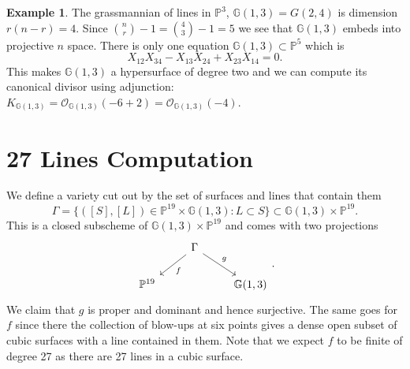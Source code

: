 \documentclass[12pt]{article}
\numberwithin{equation}{section}
\theoremstyle{definition}
\newtheorem{example}[theorem]{Example}
\theoremstyle{remark}
\newcommand{\Ocal}{\mathcal{O}}
\newcommand{\PP}{\mathbb{P}}
\newcommand{\GG}{\mathbb{G}}
\begin{document}
\begin{example}
	The grassmannian of lines in $\PP^3$, $\GG(1,3) = G(2,4)$ is dimension $r(n-r)=4$. 
	Since ${n \choose r } -1 = {4 \choose 3} -1 =5$ we see that $\GG(1,3)$ embeds into projective $n$ space. 
	There is only one equation $\GG(1,3)\subset \PP^5$ which is 
	$$ X_{12}X_{34}-X_{13}X_{24}+X_{23}X_{14}=0.$$
	This makes $\GG(1,3)$ a hypersurface of degree two and we can compute its canonical divisor using adjunction: $ K_{\GG(1,3)} = \Ocal_{\GG(1,3)}(-6+2) = \Ocal_{\GG(1,3)}(-4).$
\end{example}

\section{27 Lines Computation}

We define a variety cut out by the set of surfaces and lines that contain them
$$ \Gamma = \lbrace ([S],[L]) \in \PP^{19}\times \GG(1,3) \colon L \subset S \rbrace \subset \GG(1,3) \times \PP^{19}.$$
This is a closed subscheme of $\GG(1,3)\times \PP^{19}$ and comes with two projections 
$$\begin{tikzcd} 
& \Gamma \ar[dr,  "g"] \ar[dl, "f"]& \\
\PP^{19} & & \GG(1,3)  
\end{tikzcd}.$$
We claim that $g$ is proper and dominant and hence surjective. 
The same goes for $f$ since there the collection of blow-ups at six points gives a dense open subset of cubic surfaces with a line contained in them.
Note that we expect $f$ to be finite of degree 27 as there are 27 lines in a cubic surface. 
\end{document}
